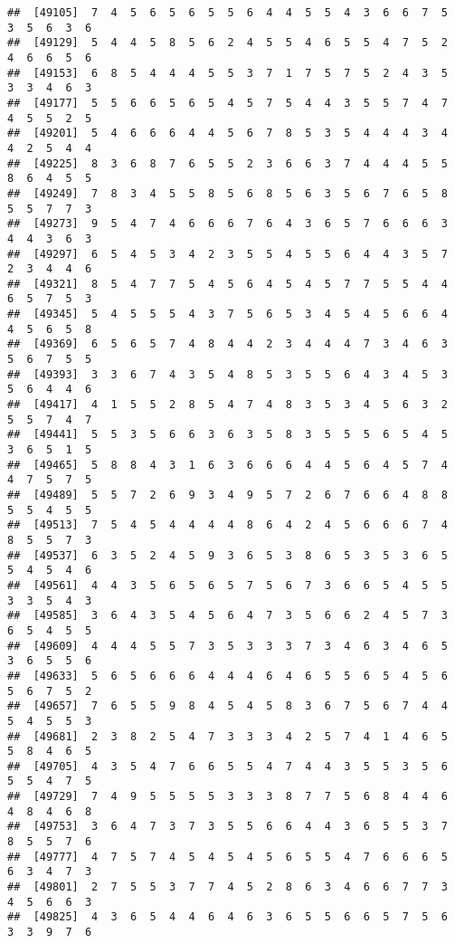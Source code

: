 \documentclass[
]{book}
\begin{document}
\begin{verbatim}
##  [49105]  7  4  5  6  5  6  5  5  6  4  4  5  5  4  3  6  6  7  5  3  5  6  3  6
##  [49129]  5  4  4  5  8  5  6  2  4  5  5  4  6  5  5  4  7  5  2  4  6  6  5  6
##  [49153]  6  8  5  4  4  4  5  5  3  7  1  7  5  7  5  2  4  3  5  3  3  4  6  3
##  [49177]  5  5  6  6  5  6  5  4  5  7  5  4  4  3  5  5  7  4  7  4  5  5  2  5
##  [49201]  5  4  6  6  6  4  4  5  6  7  8  5  3  5  4  4  4  3  4  4  2  5  4  4
##  [49225]  8  3  6  8  7  6  5  5  2  3  6  6  3  7  4  4  4  5  5  8  6  4  5  5
##  [49249]  7  8  3  4  5  5  8  5  6  8  5  6  3  5  6  7  6  5  8  5  5  7  7  3
##  [49273]  9  5  4  7  4  6  6  6  7  6  4  3  6  5  7  6  6  6  3  4  4  3  6  3
##  [49297]  6  5  4  5  3  4  2  3  5  5  4  5  5  6  4  4  3  5  7  2  3  4  4  6
##  [49321]  8  5  4  7  7  5  4  5  6  4  5  4  5  7  7  5  5  4  4  6  5  7  5  3
##  [49345]  5  4  5  5  5  4  3  7  5  6  5  3  4  5  4  5  6  6  4  4  5  6  5  8
##  [49369]  6  5  6  5  7  4  8  4  4  2  3  4  4  4  7  3  4  6  3  5  6  7  5  5
##  [49393]  3  3  6  7  4  3  5  4  8  5  3  5  5  6  4  3  4  5  3  5  6  4  4  6
##  [49417]  4  1  5  5  2  8  5  4  7  4  8  3  5  3  4  5  6  3  2  5  5  7  4  7
##  [49441]  5  5  3  5  6  6  3  6  3  5  8  3  5  5  5  6  5  4  5  3  6  5  1  5
##  [49465]  5  8  8  4  3  1  6  3  6  6  6  4  4  5  6  4  5  7  4  4  7  5  7  5
##  [49489]  5  5  7  2  6  9  3  4  9  5  7  2  6  7  6  6  4  8  8  5  5  4  5  5
##  [49513]  7  5  4  5  4  4  4  4  8  6  4  2  4  5  6  6  6  7  4  8  5  5  7  3
##  [49537]  6  3  5  2  4  5  9  3  6  5  3  8  6  5  3  5  3  6  5  5  4  5  4  6
##  [49561]  4  4  3  5  6  5  6  5  7  5  6  7  3  6  6  5  4  5  5  3  3  5  4  3
##  [49585]  3  6  4  3  5  4  5  6  4  7  3  5  6  6  2  4  5  7  3  6  5  4  5  5
##  [49609]  4  4  4  5  5  7  3  5  3  3  3  7  3  4  6  3  4  6  5  3  6  5  5  6
##  [49633]  5  6  5  6  6  6  4  4  4  6  4  6  5  5  6  5  4  5  6  5  6  7  5  2
##  [49657]  7  6  5  5  9  8  4  5  4  5  8  3  6  7  5  6  7  4  4  5  4  5  5  3
##  [49681]  2  3  8  2  5  4  7  3  3  3  4  2  5  7  4  1  4  6  5  5  8  4  6  5
##  [49705]  4  3  5  4  7  6  6  5  5  4  7  4  4  3  5  5  3  5  6  5  5  4  7  5
##  [49729]  7  4  9  5  5  5  5  3  3  3  8  7  7  5  6  8  4  4  6  4  8  4  6  8
##  [49753]  3  6  4  7  3  7  3  5  5  6  6  4  4  3  6  5  5  3  7  8  5  5  7  6
##  [49777]  4  7  5  7  4  5  4  5  4  5  6  5  5  4  7  6  6  6  5  6  3  4  7  3
##  [49801]  2  7  5  5  3  7  7  4  5  2  8  6  3  4  6  6  7  7  3  4  5  6  6  3
##  [49825]  4  3  6  5  4  4  6  4  6  3  6  5  5  6  6  5  7  5  6  3  3  9  7  6

\end{verbatim}
\end{document}
